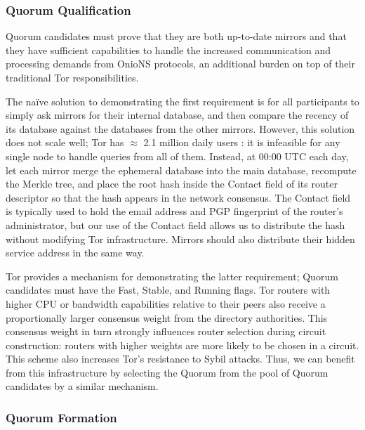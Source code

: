 \documentclass[USenglish,oneside,twocolumn]{article}
\begin{document}
\subsubsection{Quorum Qualification}
\label{sec:qQualification}

Quorum candidates must prove that they are both up-to-date mirrors and that they have sufficient capabilities to handle the increased communication and processing demands from OnioNS protocols, an additional burden on top of their traditional Tor responsibilities.

The na\"{i}ve solution to demonstrating the first requirement is for all participants to simply ask mirrors for their internal database, and then compare the recency of its database against the databases from the other mirrors. However, this solution does not scale well; Tor has $ \approx $ 2.1 million daily users \cite{TorMetrics}: it is infeasible for any single node to handle queries from all of them. Instead, at 00:00 UTC each day, let each mirror merge the ephemeral database into the main database, recompute the Merkle tree, and place the root hash inside the Contact field of its router descriptor so that the hash appears in the network consensus. The Contact field is typically used to hold the email address and PGP fingerprint of the router's administrator, but our use of the Contact field allows us to distribute the hash without modifying Tor infrastructure. Mirrors should also distribute their hidden service address in the same way. %

Tor provides a mechanism for demonstrating the latter requirement; Quorum candidates must have the Fast, Stable, and Running flags. Tor routers with higher CPU or bandwidth capabilities relative to their peers also receive a proportionally larger consensus weight from the directory authorities. This consensus weight in turn strongly influences router selection during circuit construction: routers with higher weights are more likely to be chosen in a circuit. This scheme also increases Tor's resistance to Sybil attacks. Thus, we can benefit from this infrastructure by selecting the Quorum from the pool of Quorum candidates by a similar mechanism.

\subsubsection{Quorum Formation}
\label{sec:qFormation}
\end{document}
